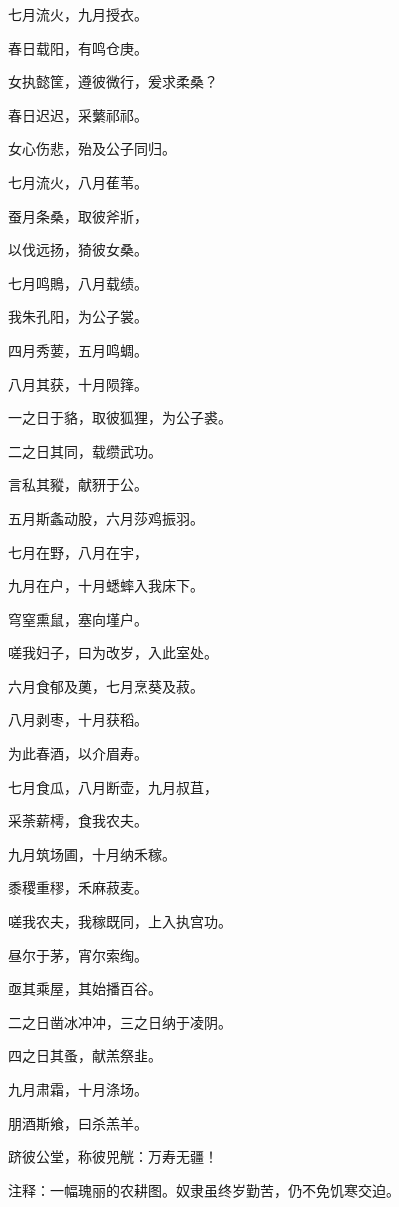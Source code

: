 \documentclass[12pt,UTF8]{ctexbook}
\begin{document}
七月流火，九月授衣。

春日载阳，有鸣仓庚。

女执懿筐，遵彼微行，爰求柔桑？

春日迟迟，采蘩祁祁。

女心伤悲，殆及公子同归。

七月流火，八月萑苇。

蚕月条桑，取彼斧斨，

以伐远扬，猗彼女桑。

七月鸣鵙，八月载绩。

我朱孔阳，为公子裳。

四月秀葽，五月鸣蜩。

八月其获，十月陨箨。

一之日于貉，取彼狐狸，为公子裘。

二之日其同，载缵武功。

言私其豵，献豜于公。

五月斯螽动股，六月莎鸡振羽。

七月在野，八月在宇，

九月在户，十月蟋蟀入我床下。

穹窒熏鼠，塞向墐户。

嗟我妇子，曰为改岁，入此室处。

六月食郁及薁，七月烹葵及菽。

八月剥枣，十月获稻。

为此春酒，以介眉寿。

七月食瓜，八月断壶，九月叔苴，

采荼薪樗，食我农夫。

九月筑场圃，十月纳禾稼。

黍稷重穋，禾麻菽麦。

嗟我农夫，我稼既同，上入执宫功。

昼尔于茅，宵尔索绹。

亟其乘屋，其始播百谷。

二之日凿冰冲冲，三之日纳于凌阴。

四之日其蚤，献羔祭韭。

九月肃霜，十月涤场。

朋酒斯飨，曰杀羔羊。

跻彼公堂，称彼兕觥：万寿无疆！

注释：一幅瑰丽的农耕图。奴隶虽终岁勤苦，仍不免饥寒交迫。
\end{document}
